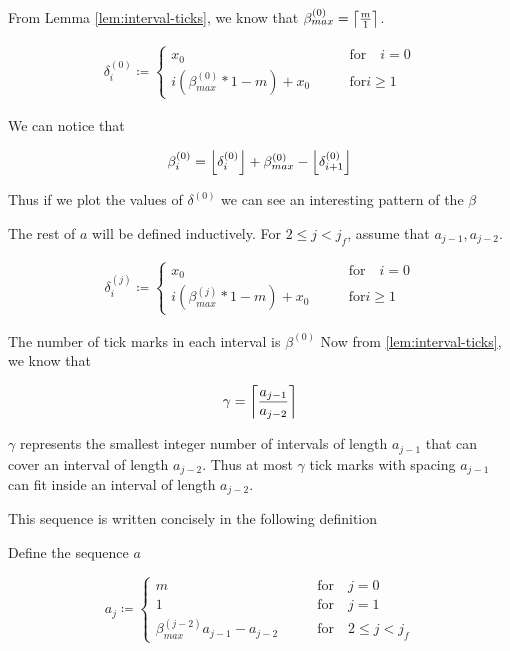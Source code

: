 From Lemma \ref{lem:interval-ticks}, we know that $\beta^{(0)}_{max} = \ceil{\frac{m}{1}}$. 

\begin{align}\label{delta_beta}
	\delta^{(0)}_i \coloneqq \begin{cases}
		x_0 \qquad &\text{for} \quad i = 0\\
		i (\beta^{(0)}_{max} * 1 - m) + x_0 \qquad &\text{for} i \ge 1
	\end{cases}
\end{align}

We can notice that

\begin{align}\label{eq:beta_i}
	\beta^{(0)}_i = \floor{\delta^{(0)}_i} + \beta^{(0)}_{max} - \floor{\delta^{(0)}_{i+1}}
\end{align}

Thus if we plot the values of $\delta^{(0)}$ we can see an interesting pattern of the $\beta$

The rest of $a$ will be defined inductively. For $2 \le j < j_f$, assume that $a_{j-1}, a_{j-2}$.

\begin{align}\label{delta_beta}
	\delta^{(j)}_i \coloneqq \begin{cases}
		x_0 \qquad &\text{for} \quad i = 0\\
		i (\beta^{(j)}_{max} * 1 - m) + x_0 \qquad &\text{for} i \ge 1
	\end{cases}
\end{align}

The number of tick marks in each interval is $\beta^{(0)}$
Now from \ref{lem:interval-ticks}, we know that 

\begin{align}
	\gamma = \ceil{\frac{a_{j-1}}{a_{j-2}}}
\end{align}

$\gamma$ represents the smallest integer number of intervals of length $a_{j-1}$ that can cover an interval of length $a_{j-2}$. Thus at most $\gamma$ tick marks with spacing $a_{j-1}$ can fit inside an interval of length $a_{j-2}$. 

This sequence is written concisely in the following definition

\begin{definition}
	Define the sequence $a$

	\begin{equation}
		a_j \coloneqq \begin{cases}
			m \qquad &\text{for} \quad j = 0\\
			1 \qquad &\text{for} \quad j = 1\\
			\beta^{(j-2)}_{max} a_{j-1} - a_{j-2} \qquad &\text{for} \quad 2 \le j < j_f
		\end{cases}
	\end{equation}

\end{definition}

